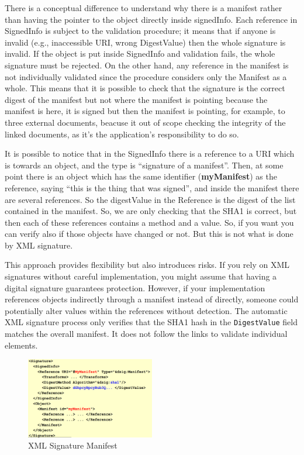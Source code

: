 There is a conceptual difference to understand why there is a manifest
rather than having the pointer to the object directly inside
signedInfo.
Each reference in SignedInfo is subject to the validation procedure;
it means that if anyone is invalid (e.g., inaccessible URI, wrong
DigestValue) then the whole signature is invalid. If the object is put
inside SignedInfo and validation fails, the whole signature must be
rejected. On the other hand, any reference in the manifest is not
individually validated since the procedure considers only the Manifest
as a whole. This means that it is possible to check that the signature
is the correct digest of the manifest but not where the manifest is
pointing because the manifest is here, it is signed but then the
manifest is pointing, for example, to three external documents,
beacuse it out of scope checking the integrity of the linked
documents, as it's the application's responsibility to do so.

It is possible to notice that in the SignedInfo there is a reference
to a URI which is towards an object, and the type is “signature of a
manifest”. Then, at some point there is an object which has the same
identifier (\textbf{myManifest}) as the reference, saying “this is the
thing that was signed”, and inside the manifest there are several
references. So the digestValue in the Reference is the digest of the
list contained in the manifest. So, we are only checking that the SHA1
is correct, but then each of these references contains a method and a
value. So, if you want you can verify also if those objects have
changed or not. But this is not what is done by XML signature.

This approach provides flexibility but also introduces risks. If you
rely on XML signatures without careful implementation, you might
assume that having a digital signature guarantees protection. However,
if your implementation references objects indirectly through a
manifest instead of directly, someone could potentially alter values
within the references without detection. The automatic XML signature
process only verifies that the SHA1 hash in the \texttt{DigestValue} field
matches the overall manifest. It does not follow the links to validate
individual elements. 


\begin{figure}[H]
  \centering
  \includegraphics[width=0.5\textwidth]{img/xml manifest.png}
  \caption{XML Signature Manifest}
  \label{fig:xml manifest}
\end{figure}


